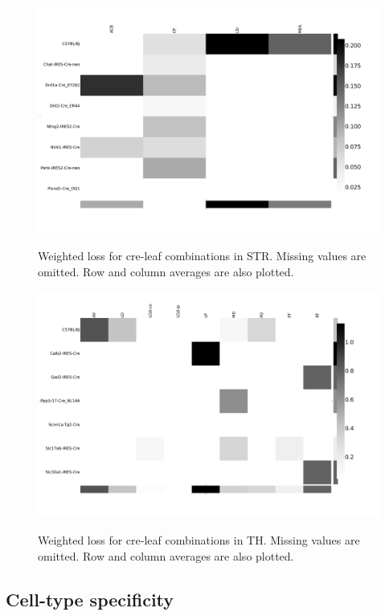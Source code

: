 \begin{figure}[H]
    \centering
    \includegraphics[width = 7in]{figs/lossdetails_477.png} 
    \label{fig:distances}
    \caption{Weighted loss for cre-leaf combinations in STR. Missing values are omitted.   Row and column averages are also plotted.}
\end{figure}

\begin{figure}[H]
    \centering
    \includegraphics[width = 7in]{figs/lossdetails_549.png} 
    \label{fig:distances}
    \caption{Weighted loss for cre-leaf combinations in TH. Missing values are omitted.   Row and column averages are also plotted.}
\end{figure}

\newpage

\subsection{Cell-type specificity}


